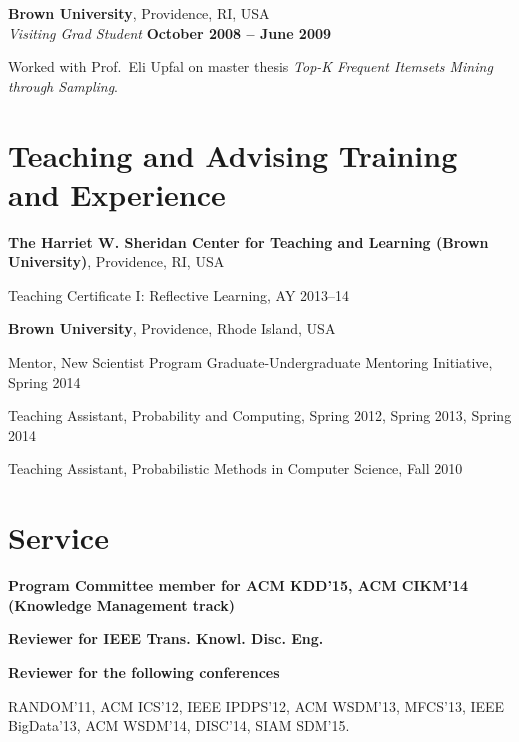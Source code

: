 \documentclass[margin,line]{resume}
\begin{document}
{\bf Brown University}, Providence, RI, USA\\
{\em Visiting Grad Student} \hfill {\bf October 2008 -- June 2009}

\begin{list2}
\vspace*{.05in}
\item Worked with Prof.~Eli Upfal on master thesis \textit{Top-K Frequent
  Itemsets Mining through Sampling}.
\end{list2}

\section{\sc Teaching and Advising Training and Experience}
{\bf The Harriet W. Sheridan Center for Teaching and Learning (Brown
University)}, Providence, RI, USA
\begin{list2}
\vspace*{.05in}
\item Teaching Certificate I: Reflective Learning, AY 2013--14
\end{list2}

{\bf Brown University}, Providence, Rhode Island, USA

\begin{list2}
\vspace*{.05in}
\item Mentor, New Scientist Program Graduate-Undergraduate Mentoring Initiative, Spring 2014
\item Teaching Assistant, Probability and Computing, Spring 2012, Spring 2013, Spring 2014
\item Teaching Assistant, Probabilistic Methods in Computer Science, Fall 2010 
\end{list2}

\section{\sc Service}
{\bf Program Committee member for ACM KDD'15, ACM CIKM'14 (Knowledge Management track) }

{\bf Reviewer for IEEE Trans. Knowl. Disc. Eng.}

{\bf Reviewer for the following conferences}
\begin{list2}
\vspace*{.05in}
\item RANDOM'11, ACM ICS'12, IEEE IPDPS'12, ACM WSDM'13, MFCS'13, IEEE BigData'13,
	ACM WSDM'14, DISC'14, SIAM SDM'15.
\end{list2}
\end{document}
